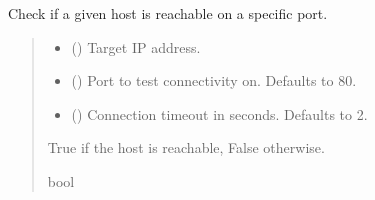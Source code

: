 \documentclass[letterpaper,10pt,english]{sphinxmanual}
\begin{document}
\begin{fulllineitems}
\label{\detokenize{modules/src.data_intake.data_intake.NVRConnection:src.data_intake.data_intake.NVRConnection.is_reachable}}
\pysigstartsignatures
\pysiglinewithargsret
{}
{\sphinxparamcomma {}\sphinxparamcomma {}}
{}
\pysigstopsignatures
\sphinxAtStartPar
Check if a given host is reachable on a specific port.
\begin{quote}\begin{description}
\begin{itemize}
\item {} 
\sphinxAtStartPar
{} () \textendash{} Target IP address.

\item {} 
\sphinxAtStartPar
{} (\sphinxstyleliteralemphasis{\sphinxupquote{, }}) \textendash{} Port to test connectivity on. Defaults to 80.

\item {} 
\sphinxAtStartPar
{} (\sphinxstyleliteralemphasis{\sphinxupquote{, }}) \textendash{} Connection timeout in seconds. Defaults to 2.

\end{itemize}

\sphinxAtStartPar
True if the host is reachable, False otherwise.

\sphinxAtStartPar
bool

\end{description}\end{quote}

\end{fulllineitems}

\end{document}
